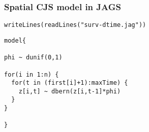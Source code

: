 \documentclass[color=usenames,dvipsnames]{beamer}\usepackage[]{graphicx}\usepackage[]{color}
\makeatletter
\newcommand{\hlstr}[1]{\textcolor[rgb]{0.749,0.012,0.012}{#1}}%
\newcommand{\hlstd}[1]{\textcolor[rgb]{0,0,0}{#1}}%
\newcommand{\hlkwd}[1]{\textcolor[rgb]{0.004,0.004,0.506}{#1}}%
\newenvironment{kframe}{%
 \def\at@end@of@kframe{}%
 \ifinner\ifhmode%
  \def\at@end@of@kframe{\end{minipage}}%
  \begin{minipage}{\columnwidth}%
 \fi\fi%
 \def\FrameCommand##1{\hskip\@totalleftmargin \hskip-\fboxsep
 \colorbox{shadecolor}{##1}\hskip-\fboxsep
     \hskip-\linewidth \hskip-\@totalleftmargin \hskip\columnwidth}%
 \MakeFramed {\advance\hsize-\width
   \@totalleftmargin\z@ \linewidth\hsize
   \@setminipage}}%
 {\par\unskip\endMakeFramed%
 \at@end@of@kframe}
\newenvironment{knitrout}{}{} %
\makeatother
\begin{document}
\begin{frame}[fragile]
  \frametitle{Spatial CJS model in JAGS}
\begin{knitrout}
\color{fgcolor}\begin{kframe}
\begin{alltt}
\hlkwd{writeLines}\hlstd{(}\hlkwd{readLines}\hlstd{(}\hlstr{"surv-dtime.jag"}\hlstd{))}
\end{alltt}
\end{kframe}
\end{knitrout}
\begin{knitrout}
\color{fgcolor}\begin{kframe}
\begin{verbatim}
model{

phi ~ dunif(0,1)

for(i in 1:n) {
  for(t in (first[i]+1):maxTime) {
    z[i,t] ~ dbern(z[i,t-1]*phi)
  }
}

}
\end{verbatim}
\end{kframe}
\end{knitrout}
\end{frame}
\end{document}
